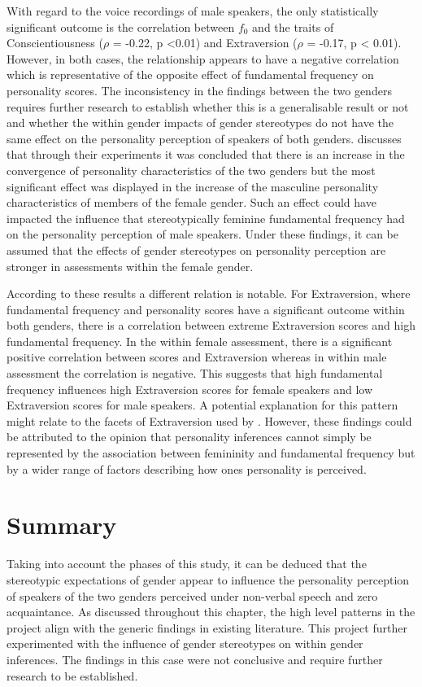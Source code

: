 \documentclass{l4proj}
\begin{document}
With regard to the voice recordings of male speakers, the only statistically significant outcome is the correlation between $f_0$ and the traits of Conscientiousness ($\rho$ = -0.22, p <0.01) and Extraversion ($\rho$ = -0.17, p < 0.01). However, in both cases, the relationship appears to have a negative correlation which is representative of the opposite effect of fundamental frequency on personality scores. 
The inconsistency in the findings between the two genders requires further research to establish whether this is a generalisable result or not and whether the within gender impacts of gender stereotypes do not have the same effect on the personality perception of speakers of both genders.
\citet{diekman2000stereotypes} discusses that through their experiments it was concluded that there is an increase in the convergence of personality characteristics of the two genders but the most significant effect was displayed in the increase of the masculine personality characteristics of members of the female gender. Such an effect could have impacted the influence that stereotypically feminine fundamental frequency had on the personality perception of male speakers. Under these findings, it can be assumed that the effects of gender stereotypes on personality perception are stronger in assessments within the female gender.

According to these results a different relation is notable. For Extraversion, where fundamental frequency and personality scores have a significant outcome within both genders, there is a correlation between extreme Extraversion scores and high fundamental frequency. In the within female assessment, there is a significant positive correlation between scores and Extraversion whereas in within male assessment the correlation is negative. This suggests that high fundamental frequency influences high Extraversion scores for female speakers and low Extraversion scores for male speakers. A potential explanation for this pattern might relate to the facets of Extraversion used by \citep{Löckenhoff2014}. However, these findings could be attributed to the opinion that personality inferences cannot simply be represented by the association between femininity and fundamental frequency but by a wider range of factors describing how ones personality is perceived.

\section{Summary}
Taking into account the phases of this study, it can be deduced that the stereotypic expectations of gender appear to influence the personality perception of speakers of the two genders perceived under non-verbal speech and zero acquaintance. As discussed throughout this chapter, the high level patterns in the project align with the generic findings in existing literature.
This project further experimented with the influence of gender stereotypes on within gender inferences. The findings in this case were not conclusive and require further research to be established. 
\end{document}
